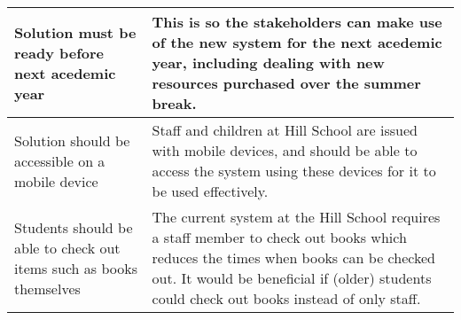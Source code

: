 \documentclass[../../../main.tex]{subfiles}
\begin{document}
\begin{tabular}{ |p{}|p{}| }
    \hline
    Solution must be ready before next acedemic year                                                              & This is so the stakeholders can make use of
    the new system for the next acedemic year, including dealing with new resources purchased over
    the summer break.                                                                                                                                                                                              \\
    \hline
    Solution should be accessible on a mobile device                                                              & Staff and children at Hill School are issued
    with mobile devices, and should be able to access the system using these devices for it to be
    used effectively.                                                                                                                                                                                              \\
    \hline
    Students should be able to check out items such as books themselves                                           & The current system at
    the Hill School requires a staff member to check out books which reduces the times when books
    can be checked out. It would be beneficial if (older) students could check out books instead of only staff.                                                                                                    \\
    \hline
\end{tabular}
\end{document}
